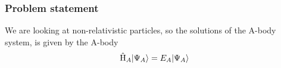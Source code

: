 \begin{frame}[fragile]
    \frametitle{Problem statement}

    We are looking at non-relativistic particles, so the solutions of the A-body system, is given by the A-body \SED
    \begin{align*}
        \hat{\mathrm{H}}_A |\Psi_A\rangle = E_A |\Psi_A\rangle
    \end{align*}
\end{frame}

